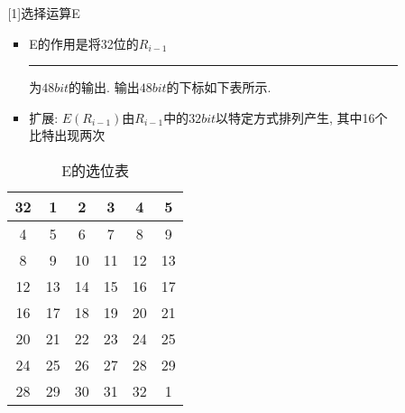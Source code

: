 \documentclass[UTF8]{ctexart}
\newcommand\hl{\bgroup\markoverwith
  {\textcolor{yellow}{\rule[-.5ex]{2pt}{2.5ex}}}\ULon}
\begin{document}
\begin{itemize}
\begin{enumerate}
\begin{itemize}
                [1]选择运算E
                \begin{itemize}
                    \item E的作用是将32位的$R_{i-1}$\hl{输入扩展}为$48bit$的输出. 输出$48bit$的下标如下表所示.
                    \item 扩展: $E(R_{i-1})$由$R_{i-1}$中的$32bit$以特定方式排列产生, 其中16个比特出现两次
                \end{itemize}
                \begin{table}[h]
                    \centering
                    \caption{E的选位表}
                    \begin{tabular}{|c|c|c|c|c|c|}
                        \hline
                        32 &1 &2 &3 &4 &5\\
                        \hline
                        4 &5 &6 &7 &8 &9\\
                        \hline
                        8 &9 &10 &11 &12 &13\\
                        \hline
                        12 &13 &14 &15 &16 &17\\
                        \hline
                        16 &17 &18 &19 &20 &21\\
                        \hline
                        20 &21 &22 &23 &24 &25\\
                        \hline
                        24 &25 &26 &27 &28 &29\\
                        \hline
                        28 &29 &30 &31 &32 &1\\
                        \hline
                    \end{tabular}
                \end{table}
            \end{itemize}


\end{enumerate}
\end{itemize}
\end{document}

